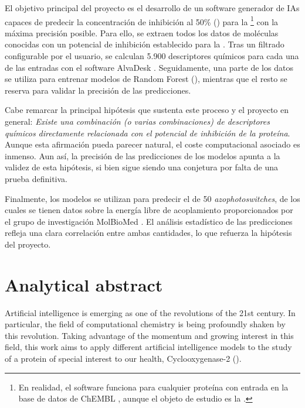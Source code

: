 \documentclass[11pt]{article}
\begin{document}
El objetivo principal del proyecto es el desarrollo de un software generador de IAs capaces de predecir la concentración de inhibición al 50\% () para la \footnote{En realidad, el software funciona para cualquier proteína con entrada en la base de datos de ChEMBL \cite{ChemblDatabase}, aunque el objeto de estudio es la .} con la máxima precisión posible. Para ello, se extraen todos los datos de moléculas conocidas con un potencial de inhibición establecido para la . Tras un filtrado configurable por el usuario, se calculan 5.900 descriptores químicos para cada una de las entradas con el software AlvaDesk \cite{MauriMolecularDescriptorsBook}\cite{AlvaDescSecondPaper}. Seguidamente, una parte de los datos se utiliza para entrenar modelos de Random Forest ()\cite{MachineLearningRandomForest}, mientras que el resto se reserva para validar la precisión de las predicciones.

Cabe remarcar la principal hipótesis que sustenta este proceso y el proyecto en general: \emph{Existe una combinación (o varias combinaciones) de descriptores químicos directamente relacionada con el potencial de inhibición de la proteína}. Aunque esta afirmación pueda parecer natural, el coste computacional asociado es inmenso. Aun así, la precisión de las predicciones de los modelos apunta a la validez de esta hipótesis, si bien sigue siendo una conjetura por falta de una prueba definitiva.

Finalmente, los modelos se utilizan para predecir el  de 50 \emph{azophotoswitches}, de los cuales se tienen datos sobre la energía libre de acoplamiento proporcionados por el grupo de investigación MolBioMed \cite{molbiomed}. El análisis estadístico de las predicciones refleja una clara correlación entre ambas cantidades, lo que refuerza la hipótesis del proyecto.

\newpage

\section*{Analytical abstract}
\hspace{0.55cm}Artificial intelligence is emerging as one of the revolutions of the 21st century. In particular, the field of computational chemistry is being profoundly shaken by this revolution. Taking advantage of the momentum and growing interest in this field, this work aims to apply different artificial intelligence models to the study of a protein of special interest to our health, Cyclooxygenase-2 ().
\end{document}

